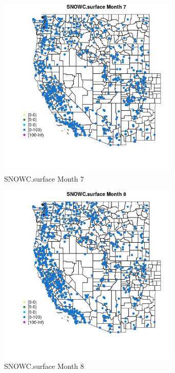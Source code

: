 \begin{figure} 
\centering  
\includegraphics[width=0.77\textwidth]{Code_Outputs/Report_ML_input_PM25_Step4_part_f_de_duplicated_aves_prioritize_24hr_obswNAs_MapObsMo7SNOWCsurface.jpg} 
\caption{\label{fig:Report_ML_input_PM25_Step4_part_f_de_duplicated_aves_prioritize_24hr_obswNAsMapObsMo7SNOWCsurface}SNOWC.surface Month 7} 
\end{figure} 
 

\clearpage 

\begin{figure} 
\centering  
\includegraphics[width=0.77\textwidth]{Code_Outputs/Report_ML_input_PM25_Step4_part_f_de_duplicated_aves_prioritize_24hr_obswNAs_MapObsMo8SNOWCsurface.jpg} 
\caption{\label{fig:Report_ML_input_PM25_Step4_part_f_de_duplicated_aves_prioritize_24hr_obswNAsMapObsMo8SNOWCsurface}SNOWC.surface Month 8} 
\end{figure} 
 

